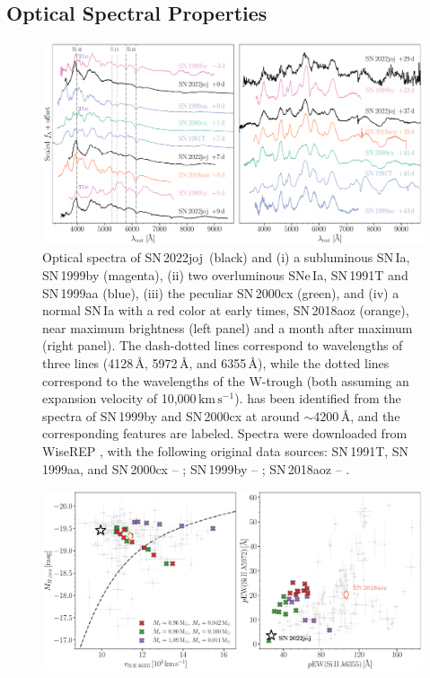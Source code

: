 \documentclass[twocolumn]{aastex631}
\newcommand{\sn}{SN\,2022joj}
\newcommand{\kms}{$\mathrm{km}\,\mathrm{s}^{-1}$}
\begin{document}
\begin{CJK*}{UTF8}{gbsn}
\subsection{Optical Spectral Properties} \label{sec:analysis_spec}
\begin{figure}
    \centering
    \includegraphics[width=\linewidth]{spec_comp.pdf}
    \caption{Optical spectra of \sn\ (black) and (i) a subluminous SN\,Ia, SN\,1999by (magenta), (ii) two overluminous SNe\,Ia, SN\,1991T and SN\,1999aa (blue), (iii) the peculiar SN\,2000cx (green), and (iv) a normal SN\,Ia with a red color at early times, SN\,2018aoz (orange), near maximum brightness (left panel) and a month after maximum (right panel). The dash-dotted lines correspond to wavelengths of three  lines (4128\,\r{A}, 5972\,\r{A}, and 6355\,\r{A}), while the dotted lines correspond to the wavelengths of the  W-trough (both assuming an expansion velocity of 10,000\,\kms).  has been identified from the spectra of SN\,1999by and SN\,2000cx at around $\sim$4200\,\r{A}, and the corresponding features are labeled. Spectra were downloaded from WiseREP  \citep{wiserep_2012}, with the following original data sources: SN\,1991T, SN\,1999aa, and SN\,2000cx -- \citet{Silverman_UCBIa_2012}; SN\,1999by -- \citet{Matheson_cfaIa_2008}; SN\,2018aoz -- \citet{Ni_18aoz_2023}.}
    \label{fig:spec_comp}
\end{figure}
\begin{figure}
    \centering
    \includegraphics[width=\linewidth]{phase_space.pdf}

\end{figure}
\end{CJK*}
\end{document}

